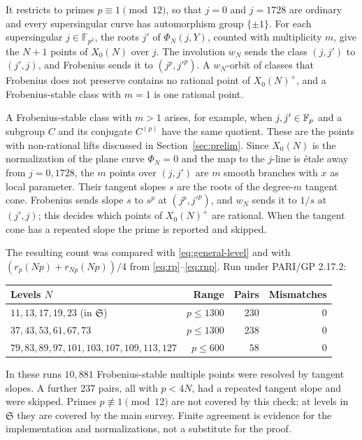 \documentclass[11pt,a4paper]{article}
\theoremstyle{remark}\newtheorem{remark}[theorem]{Remark}
\numberwithin{equation}{section}
\begin{document}
It restricts to primes $p\equiv1\pmod{12}$, so that $j=0$ and $j=1728$ are ordinary and every supersingular curve has automorphism group $\{\pm1\}$. For each supersingular $j\in\mathbb F_{p^2}$, the roots $j'$ of $\Phi_N(j,Y)$, counted with multiplicity $m$, give the $N+1$ points of $X_0(N)$ over $j$. The involution $w_N$ sends the class $(j,j')$ to $(j',j)$, and Frobenius sends it to $(j^p,j'^p)$. A $w_N$-orbit of classes that Frobenius does not preserve contains no rational point of $X_0(N)^+$, and a Frobenius-stable class with $m=1$ is one rational point.

A Frobenius-stable class with $m>1$ arises, for example, when $j,j'\in\mathbb F_p$ and a subgroup $C$ and its conjugate $C^{(p)}$ have the same quotient. These are the points with non-rational lifts discussed in Section~\ref{sec:prelim}. Since $X_0(N)$ is the normalization of the plane curve $\Phi_N=0$ and the map to the $j$-line is \'etale away from $j=0,1728$, the $m$ points over $(j,j')$ are $m$ smooth branches with $x$ as local parameter. Their tangent slopes $s$ are the roots of the degree-$m$ tangent cone. Frobenius sends slope $s$ to $s^p$ at $(j^p,j'^p)$, and $w_N$ sends it to $1/s$ at $(j',j)$; this decides which points of $X_0(N)^+$ are rational. When the tangent cone has a repeated slope the prime is reported and skipped.

The resulting count was compared with \eqref{eq:general-level} and with $(r_p(Np)+r_{Np}(Np))/4$ from \eqref{eq:rp}--\eqref{eq:rnp}. Run under PARI/GP 2.17.2:
\begin{center}
\begin{tabular}{lrrr}\toprule
Levels $N$ & Range & Pairs & Mismatches\\\midrule
$11,13,17,19,23$ (in $\mathfrak S$) & $p\leq1300$ & $230$ & $0$\\
$37,43,53,61,67,73$ & $p\leq1300$ & $238$ & $0$\\
$79,83,89,97,101,103,107,109,113,127$ & $p\leq600$ & $58$ & $0$\\\bottomrule
\end{tabular}
\end{center}
In these runs $10{,}881$ Frobenius-stable multiple points were resolved by tangent slopes. A further $237$ pairs, all with $p<4N$, had a repeated tangent slope and were skipped. Primes $p\not\equiv1\pmod{12}$ are not covered by this check; at levels in $\mathfrak S$ they are covered by the main survey. Finite agreement is evidence for the implementation and normalizations, not a substitute for the proof.
\end{document}
